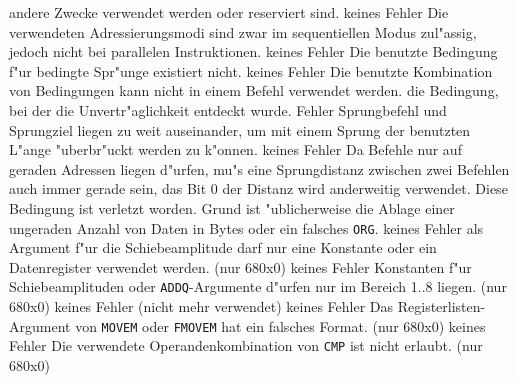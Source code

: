 \documentclass[12pt,a4paper,twoside]{report}
\newcommand{\tty}[1]{{\tt #1}}
\begin{document}
{\begin{description}
{                andere Zwecke verwendet werden oder reserviert sind.}
               {keines}
               {Fehler}
               {Die verwendeten Adressierungsmodi
                sind zwar im sequentiellen Modus zul"assig, jedoch nicht
                bei parallelen Instruktionen.}
               {keines}
               {Fehler}
               {Die benutzte Bedingung f"ur bedingte Spr"unge
                existiert nicht.}
               {keines}
               {Fehler}
               {Die benutzte Kombination von Bedingungen kann nicht
                in einem Befehl verwendet werden.}
               {die Bedingung, bei der die Unvertr"aglichkeit
                entdeckt wurde.}
               {Fehler}
               {Sprungbefehl und Sprungziel liegen zu weit
                auseinander, um mit einem Sprung der benutzten L"ange
                "uberbr"uckt werden zu k"onnen.}
               {keines}
               {Fehler}
               {Da Befehle nur auf geraden Adressen liegen
                d"urfen, mu"s eine Sprungdistanz zwischen zwei Befehlen
                auch immer gerade sein, das Bit 0 der Distanz wird
                anderweitig verwendet.  Diese Bedingung ist verletzt
                worden.  Grund ist "ublicherweise die Ablage einer
                ungeraden Anzahl von Daten in Bytes oder ein falsches \tty{ORG}.}
               {keines}
               {Fehler}
               {als Argument f"ur die Schiebeamplitude darf nur
                eine Konstante oder ein Datenregister verwendet werden.
                (nur 680x0)}
               {keines}
               {Fehler}
               {Konstanten f"ur Schiebeamplituden oder
                \tty{ADDQ}-Argumente d"urfen nur im Bereich 1..8 liegen. (nur
                680x0)}
               {keines}
               {Fehler}
               {(nicht mehr verwendet)}
               {keines}
               {Fehler}
               {Das Registerlisten-Argument von \tty{MOVEM}
	        oder \tty{FMOVEM} hat ein falsches Format. (nur 680x0)}
               {keines}
               {Fehler}
               {Die verwendete Operandenkombination von \tty{CMP}
	        ist nicht erlaubt. (nur 680x0)}

\end{description}}
\end{document}
